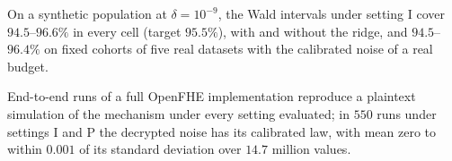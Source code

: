 %
%

On a synthetic population at $\delta = 10^{-9}$, the Wald intervals under setting I cover $94.5$--$96.6\%$ in every cell (target $95.5\%$), with and without the ridge, and $94.5$--$96.4\%$ on fixed cohorts of five real datasets with the calibrated noise of a real budget.

End-to-end runs of a full OpenFHE implementation reproduce a plaintext simulation of the mechanism under every setting evaluated; in $550$ runs under settings I and P the decrypted noise has its calibrated law, with mean zero to within $0.001$ of its standard deviation over $14.7$ million values.

